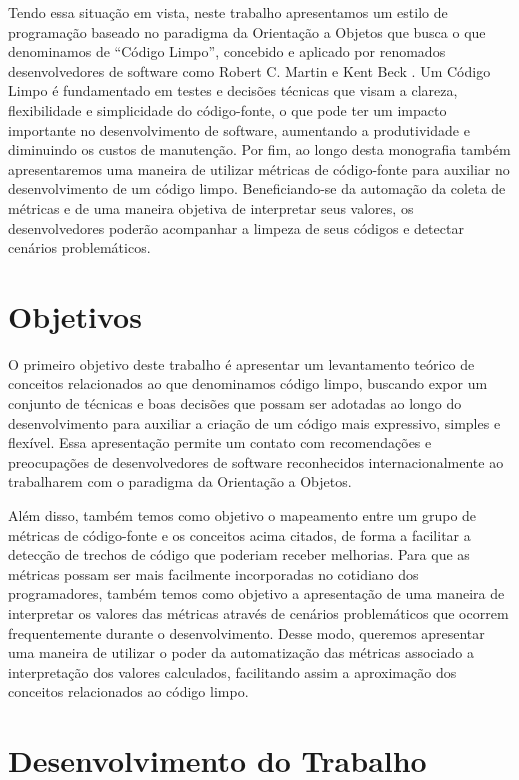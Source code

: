 Tendo essa situação em vista, neste trabalho apresentamos um estilo de programação baseado
no paradigma da Orientação a Objetos que busca o que denominamos de ``Código Limpo'', concebido e aplicado por renomados desenvolvedores de software
como Robert C. Martin \citep{Martin2008} e Kent Beck \citep{Beck2007}.
%
Um Código Limpo é fundamentado em testes e decisões técnicas que visam a clareza, flexibilidade
e simplicidade do código-fonte, o que pode ter um impacto importante no desenvolvimento
de software, aumentando a produtividade e diminuindo os custos de manutenção.
%
Por fim, ao longo desta monografia também apresentaremos uma maneira de utilizar métricas de código-fonte para auxiliar no desenvolvimento
de um código limpo. Beneficiando-se da automação da coleta de métricas e de uma maneira objetiva de interpretar seus valores,
os desenvolvedores poderão acompanhar a limpeza de seus códigos e detectar cenários problemáticos.

\section{Objetivos}
\label{sec:objetivo}

O primeiro objetivo deste trabalho é apresentar um levantamento teórico de conceitos relacionados ao que denominamos
código limpo, buscando expor um conjunto de técnicas e boas decisões que possam ser adotadas ao longo do
desenvolvimento para auxiliar a criação de um código mais expressivo, simples e flexível. Essa apresentação permite um
contato com recomendações e preocupações de desenvolvedores de software reconhecidos internacionalmente ao trabalharem com
o paradigma da Orientação a Objetos.

Além disso, também temos como objetivo o mapeamento entre um grupo de métricas de código-fonte e os conceitos acima 
citados, de forma a facilitar a detecção de trechos de código que poderiam receber melhorias. Para que as
métricas possam ser mais facilmente incorporadas no cotidiano dos programadores, também temos como objetivo a apresentação
de uma maneira de interpretar os valores das métricas através de cenários problemáticos que ocorrem frequentemente durante
o desenvolvimento.
%
Desse modo, queremos apresentar uma maneira de utilizar o poder da automatização das métricas associado a interpretação dos valores calculados,
facilitando assim a aproximação dos conceitos relacionados ao código limpo.

\section{Desenvolvimento do Trabalho}
\label{sec:desenvolvimento}

